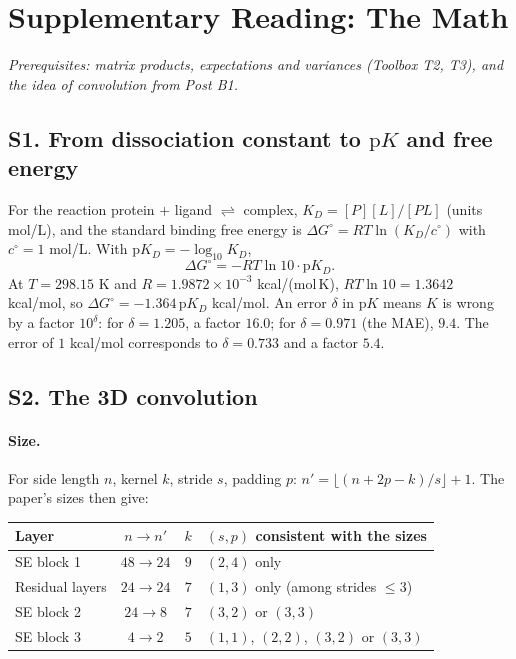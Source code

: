 \documentclass[11pt]{article}
\newcommand{\pK}{\mathrm{p}K}
\begin{document}
\clearpage
\section*{Supplementary Reading: The Math}
\textit{Prerequisites: matrix products, expectations and variances (Toolbox T2, T3), and the idea of convolution from Post B1.}

\label{sec:S1}
\subsection*{S1. From dissociation constant to $\pK$ and free energy}
For the reaction protein $+$ ligand $\rightleftharpoons$ complex, $K_D=[P][L]/[PL]$ (units mol/L), and the standard binding free energy is $\Delta G^\circ=RT\ln(K_D/c^\circ)$ with $c^\circ=1$ mol/L. With $\pK_D=-\log_{10}K_D$,
\[
  \Delta G^\circ=-RT\ln10\cdot\pK_D .
\]
At $T=298.15$ K and $R=1.9872\times10^{-3}$ kcal/(mol\,K), $RT\ln10=1.3642$ kcal/mol, so $\Delta G^\circ=-1.364\,\pK_D$ kcal/mol. An error $\delta$ in $\pK$ means $K$ is wrong by a factor $10^{\delta}$: for $\delta=1.205$, a factor $16.0$; for $\delta=0.971$ (the MAE), $9.4$. The error of $1$ kcal/mol corresponds to $\delta=0.733$ and a factor $5.4$.

\label{sec:S2}
\subsection*{S2. The 3D convolution}
\paragraph{Size.} For side length $n$, kernel $k$, stride $s$, padding $p$: $n'=\lfloor(n+2p-k)/s\rfloor+1$. The paper's sizes then give:
\begin{center}
\small
\begin{tabular}{@{}lccl@{}}
\toprule
Layer & $n\to n'$ & $k$ & $(s,p)$ consistent with the sizes\\
\midrule
SE block 1 & $48\to24$ & $9$ & $(2,4)$ only\\
Residual layers & $24\to24$ & $7$ & $(1,3)$ only (among strides $\le3$)\\
SE block 2 & $24\to8$ & $7$ & $(3,2)$ or $(3,3)$\\
SE block 3 & $4\to2$ & $5$ & $(1,1)$, $(2,2)$, $(3,2)$ or $(3,3)$\\
\bottomrule
\end{tabular}
\end{center}
\end{document}
